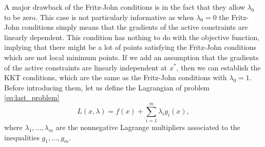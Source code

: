 \documentclass[10pt,a4paper]{article}
\begin{document}
A major drawback of the Fritz-John conditions is in the fact that they allow $\lambda_0$ to be
zero. This case is not particularly informative as when $\lambda_0=0$ the Fritz-John conditions simply means that the gradients of the active constraints are linearly dependent. This condition has nothing to do with the objective function, implying that
there might be a lot of points satisfying the Fritz-John conditions which are not local minimum points. If we add an assumption that the gradients of the active constraints are linearly independent at $x^*$, then we can establish the KKT conditions, which are the same as the Fritz-John conditions with $\lambda_0 = 1$. Before introducing them, let us define the Lagrangian of problem \eqref{eq:last_problem}
\begin{equation}\label{eq:lagrange}
	L(x,\lambda) = f(x) +\sum_{i=1}^m \lambda_i g_i(x),
\end{equation}
where $\lambda_1, \dots, \lambda_m$ are the nonnegative Lagrange multipliers associated to the inequalities $g_1, \dots, g_m$.
\end{document}
